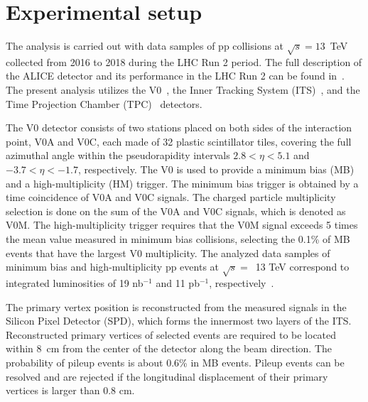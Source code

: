 

\section{Experimental setup}
\label{sec:experiment}

The analysis is carried out with data samples of pp collisions at $\sqrt{s} = 13$~TeV collected from 2016 to 2018 during the LHC Run 2 period. The full description of the ALICE detector and its performance in the LHC Run 2 can be found in~\cite{Aamodt:2008zz,Abelev:2014ffa}. The present analysis utilizes the V0~\cite{Abbas:2013taa}, the Inner Tracking System (ITS)~\cite{aliceITS}, and the Time Projection Chamber (TPC)~\cite{aliceTPC} detectors.

The V0 detector consists of two stations placed on both sides of the interaction point, V0A and V0C, each made of 32 plastic scintillator tiles, covering the full azimuthal angle within the pseudorapidity intervals $2.8 < \eta < 5.1$ and $-3.7 < \eta < -1.7$, respectively. The V0 is used to provide a minimum bias (MB) and a high-multiplicity (HM) trigger. The minimum bias trigger is obtained by a time coincidence of V0A and V0C signals. The charged particle multiplicity selection is done on the sum of the V0A and V0C signals, which is denoted as V0M. The high-multiplicity trigger requires that the V0M signal exceeds 5 times the mean value measured in minimum bias collisions, selecting the 0.1\% of MB events that have the largest V0 multiplicity. The analyzed data samples of minimum bias and high-multiplicity pp events at $\sqrt{s}=$~13 TeV correspond to integrated luminosities of 19 nb$^{-1}$ and 11 pb$^{-1}$, respectively~\cite{ALICE-PUBLIC-2016-002}.

The primary vertex position is reconstructed from the measured signals in the Silicon Pixel Detector (SPD), which forms the innermost two layers of the ITS. Reconstructed primary vertices of selected events are required to be located within 8~cm from the center of the detector along the beam direction. The probability of pileup events is about 0.6\% in MB events. Pileup events can be resolved and are rejected if the longitudinal displacement of their primary vertices is larger than 0.8 cm.

